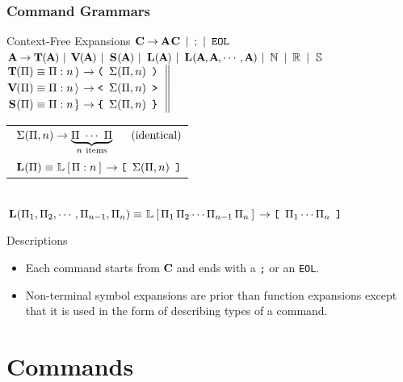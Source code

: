\documentclass[10pt]{beamer}
\begin{document}
\begin{frame}[t] \frametitle{Command Grammars}

	\begin{block}{Context-Free Expansions}
		$\left.\CMD \EXP \ARG \CMD \SEP \,\text{;}\, \SEP \,\texttt{EOL} \right.$ \\ [.24em]
		$\left.\ARG \EXP \TUP(\ARG) \SEP \VCT(\ARG) \SEP \SET(\ARG) \SEP
		 \LST(\ARG) \SEP \LST(\ARG, \ARG, \cdots, \ARG) \SEP \MSN \SEP \MSR \SEP \MSS \right.$ \\ [.27em]
		$\left.\text{%
		\begin{tabular}{@{}l}%
			$\TUP(\Pi) \EQV \Tup{\Pi}{n} \EXP \texttt{\TupBrkL}     \ \, \Sigma(\Pi, n) \ \, \texttt{\TupBrkR}$ \\ [.24em]
			$\VCT(\Pi) \EQV \Vct{\Pi}{n} \EXP \texttt{\VctBrkTextL} \ \, \Sigma(\Pi, n) \ \, \texttt{\VctBrkTextR}$ \\ [.24em]
			$\SET(\Pi) \EQV \Set{\Pi}{n} \EXP \texttt{\SetBrkL}     \ \, \Sigma(\Pi, n) \ \, \texttt{\SetBrkR}$
		\end{tabular}} \right\|$%
		\begin{tabular}{@{}l}%
			$\ \Sigma(\Pi, n) \rightarrow \underbrace{\Pi \ \cdots \ \Pi}_{n \ \text{items}} \quad\,\ \text{(identical)}$ \\ [1.725em]
			$\ \LST(\Pi) \EQV \Lst{\Pi}{n} \EXP \texttt{\LstBrkL} \ \, \Sigma(\Pi, n) \ \, \texttt{\LstBrkR}$
		\end{tabular} \\ [.24em]
		$\left.\LST(\Pi_1,\Pi_2,\cdots,\Pi_{n-1},\Pi_n) \EQV \kern.05em \LstFull{\Pi_1\,\Pi_2\cdots\Pi_{n-1}\,\Pi_n} \EXP
		 \texttt{\LstBrkL} \ \, \Pi_1\cdots\Pi_n \ \, \texttt{\LstBrkR}\right.$
	\end{block}

	\begin{block}{Descriptions}
		\begin{itemize}
			\item Each command starts from $\CMD$ and ends with a \texttt{;} or an \texttt{EOL}.
			\item Non-terminal symbol expansions are prior than function expansions except that it is used in the form of describing types of a command.
		\end{itemize}
	\end{block}

\end{frame}


\section{Commands}
\end{document}
